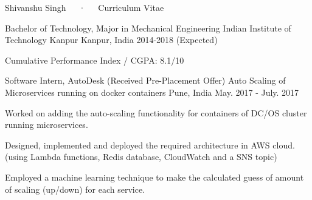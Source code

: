 \documentclass[11pt, a4paper]{cv}
\begin{document}
\makecvheader

\makecvfooter
  {}
  {Shivanshu Singh~~~·~~~Curriculum Vitae}
  {\thepage}


\begin{cventries}

  \cventry
    {Bachelor of Technology, Major in Mechanical Engineering} %
    {Indian Institute of Technology Kanpur} %
    {Kanpur, India} %
        {2014-2018 (Expected)} %
    {
      \begin{cvitems} %
        \item {Cumulative Performance Index / CGPA: 8.1/10}
      \end{cvitems}
    }

\end{cventries}



\begin{cventries}

  \cventry
    {Software Intern, AutoDesk (Received Pre-Placement Offer)} %
    {Auto Scaling of Microservices running on docker containers} %
    {Pune, India} %
    {May. 2017 - July. 2017} %
    {
      \begin{cvitems} %
        \item {Worked on adding the auto-scaling functionality for containers of DC/OS cluster running microservices.}
        \item {Designed, implemented and deployed the required architecture in AWS cloud. (using Lambda functions, Redis database, CloudWatch and a SNS topic)}
        \item {Employed a machine learning technique to make the calculated guess of amount of scaling (up/down) for each service.}
      \end{cvitems}
    }

\end{cventries}

\end{document}
